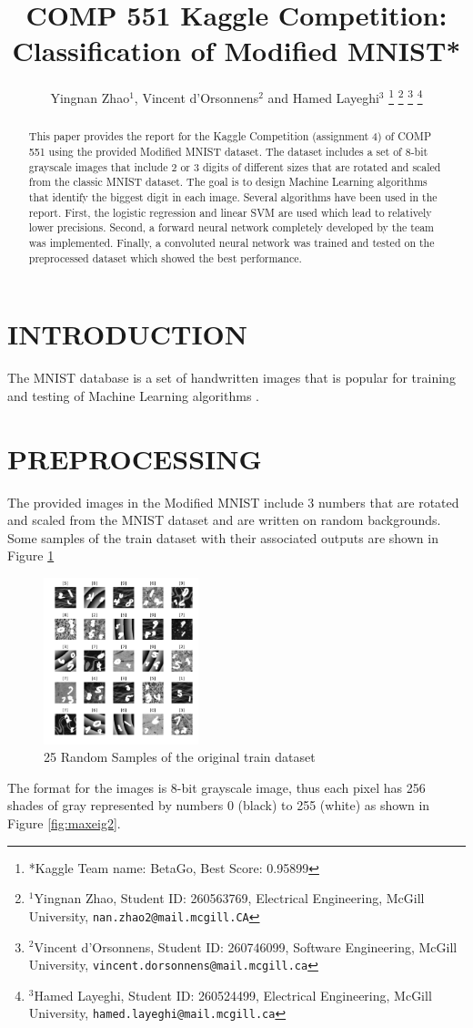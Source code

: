 \documentclass[letterpaper, 10 pt, conference]{ieeeconf}  %
\title{\LARGE \bf
COMP 551 Kaggle Competition: Classification of Modified MNIST*
}
\author{Yingnan Zhao$^{1}$, Vincent d'Orsonnens$^{2}$ and Hamed Layeghi$^{3}$%
\thanks{*Kaggle Team name: BetaGo, Best Score: 0.95899}%
\thanks{$^{1}$Yingnan Zhao, Student ID: 260563769, Electrical Engineering, 
        McGill University,
        {\tt\small nan.zhao2@mail.mcgill.CA}}%
\thanks{$^{2}$Vincent d'Orsonnens, Student ID: 260746099, Software Engineering, McGill University, 
        {\tt\small vincent.dorsonnens@mail.mcgill.ca}}%
\thanks{$^{3}$Hamed Layeghi, Student ID: 260524499, Electrical Engineering, McGill University, 
	{\tt\small hamed.layeghi@mail.mcgill.ca}}%
}
\begin{document}
\maketitle
\thispagestyle{empty}
\pagestyle{empty}


\begin{abstract}
This paper provides the report for the Kaggle Competition (assignment 4) of COMP 551 using the provided Modified MNIST dataset. The dataset includes a set of 8-bit grayscale images that include 2 or 3 digits of different sizes that are rotated and scaled from the classic MNIST dataset. The goal is to design Machine Learning algorithms that identify the biggest digit in each image. Several algorithms have been used in the report. First, the logistic regression and linear SVM are used which lead to relatively lower precisions. Second, a forward neural network completely developed by the team was implemented. Finally, a convoluted neural network was trained and tested on the preprocessed dataset which showed the best performance.  
\end{abstract}


\section{INTRODUCTION}

The MNIST database \cite{MNISTcreators} is a set of handwritten images that is popular for training and testing of Machine Learning algorithms \cite{wiki:MNIST}.

\section{PREPROCESSING}
The provided images in the Modified MNIST include 3 numbers that are rotated and scaled from the MNIST dataset and are written on random backgrounds.
Some samples of the train dataset with their associated outputs are shown in Figure \ref{fig:original}
\begin{figure}[h]
	\begin{center}
		\includegraphics[width=0.4\textwidth]{figures/originalDataset.pdf}  %
		\caption{25 Random Samples of the original train dataset}
		\label{fig:original}
	\end{center}
\end{figure}
 The format for the images is 8-bit grayscale image, thus each pixel has 256 shades of gray represented by numbers 0 (black) to 255 (white) as shown in Figure \ref{fig:maxeig2}.
\end{document}
